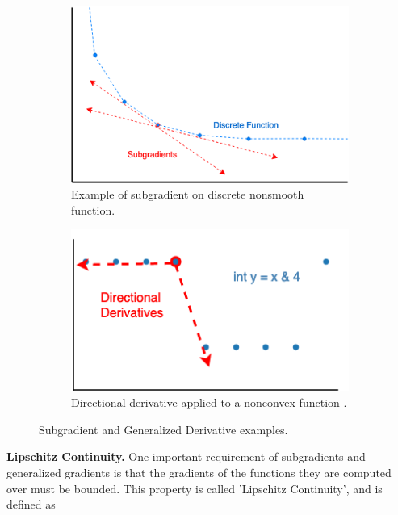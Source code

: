 \begin{figure}
  \centering
  \begin{subfigure}[b]{0.45\columnwidth}
    \includegraphics[width=\linewidth]{figs/subgradient_example}
    \caption{\label{fig:subgradient} Example of subgradient on discrete nonsmooth function.}
  \end{subfigure}
  \hspace{0.15cm}
  \begin{subfigure}[b]{0.5\columnwidth}
    \includegraphics[width=\linewidth]{figs/directional_deriv_example}
  \caption{\label{fig:dir_deriv} Directional derivative applied to a nonconvex function .}
  \end{subfigure}
  \vspace{-10pt}
  \caption{\label{fig:grad_exs} Subgradient and Generalized Derivative examples.}
  \vspace{-15pt}
\end{figure}

\noindent \textbf{Lipschitz Continuity.} One important requirement of subgradients and generalized gradients is that the gradients of the functions they are computed over must be bounded. This property is called 'Lipschitz Continuity', and is defined as

